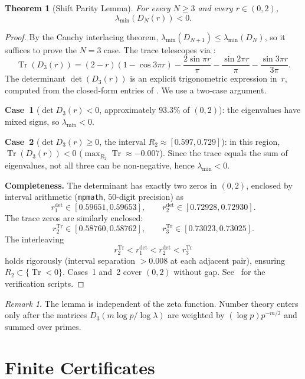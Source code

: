 \documentclass[11pt,a4paper]{article}
\newtheorem{theorem}{Theorem}[section]
\theoremstyle{remark}
\newtheorem{remark}[remark]{Remark}
\theoremstyle{plain}
\DeclareMathOperator{\Tr}{Tr}
\begin{document}
\begin{theorem}[Shift Parity Lemma]
\label{thm:shift-parity}
For every $N\geq 3$ and every $r\in(0,2)$,
\[
  \lambda_{\min}(D_N(r))<0.
\]
\end{theorem}

\begin{proof}
By the Cauchy interlacing theorem, $\lambda_{\min}(D_{N+1})\leq\lambda_{\min}(D_N)$,
so it suffices to prove the $N=3$ case. The trace telescopes via
:
\[
  \Tr(D_3(r))=(2-r)(1-\cos 3\pi r)
  -\frac{2\sin\pi r}{\pi}
  -\frac{\sin 2\pi r}{\pi}
  -\frac{\sin 3\pi r}{3\pi}.
\]
The determinant $\det(D_3(r))$ is an explicit trigonometric expression in~$r$,
computed from the closed-form entries of .
We use a two-case argument.

\smallskip\noindent\textbf{Case~1} ($\det D_3(r)<0$, approximately $93.3\%$ of
$(0,2)$): the eigenvalues have mixed signs, so $\lambda_{\min}<0$.

\smallskip\noindent\textbf{Case~2} ($\det D_3(r)\geq 0$, the interval
$R_2\approx[0.597,0.729]$): in this region, $\Tr(D_3(r))<0$
($\max_{R_2}\Tr\approx -0.007$). Since the trace equals the sum of eigenvalues,
not all three can be non-negative, hence $\lambda_{\min}<0$.

\smallskip\noindent\textbf{Completeness.} The determinant has exactly two zeros
in $(0,2)$, enclosed by interval arithmetic (\texttt{mpmath}, $50$-digit
precision) as
\[
  r_1^{\det}\in[0.59651,0.59653],\qquad r_2^{\det}\in[0.72928,0.72930].
\]
The trace zeros are similarly enclosed:
\[
  r_2^{\Tr}\in[0.58760,0.58762],\qquad r_3^{\Tr}\in[0.73023,0.73025].
\]
The interleaving
\[
  r_2^{\Tr}<r_1^{\det}<r_2^{\det}<r_3^{\Tr}
\]
holds rigorously (interval separation $>0.008$ at each adjacent pair),
ensuring $R_2\subset\{\Tr<0\}$. Cases~1 and~2 cover $(0,2)$ without gap.
See~\cite{GeigerLandscapeII} for the verification scripts.
\end{proof}

\begin{remark}
The lemma is independent of the zeta function. Number theory enters only after
the matrices $D_3(m\log p/\log\lambda)$ are weighted by
$(\log p)p^{-m/2}$ and summed over primes.
\end{remark}

\section{Finite Certificates}
\label{sec:finite-certificates}
\end{document}
